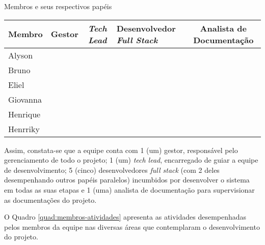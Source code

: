 \begin{quadro}[ht]
	\setlength{\tabcolsep}{3pt}
	\begin{center}
		\caption{\label{frame:distribuicao-papeis}Membros e seus respectivos papéis}
		\begin{tabular}{|l|c|c|m{3cm}|c|}
			\hline
			\textbf{Membro} & \textbf{Gestor} & \textbf{\textit{Tech Lead}} & \centering\textbf{Desenvolvedor \textit{Full Stack}} & \textbf{Analista de Documentação} \\
			\hline
			Alyson & \checkmark &  & \centering\checkmark &  \\
			\hline
			Bruno &  &  & \centering\checkmark &  \\
			\hline
			Eliel &  &  & \centering\checkmark &  \\
			\hline
			Giovanna &  &  &  & \checkmark \\
			\hline
			Henrique &  &  & \centering\checkmark &  \\
			\hline
			Henrriky &  & \checkmark & \centering\checkmark &  \\
			\hline
		\end{tabular}
	\end{center}
\end{quadro}

\indent Assim, constata-se que a equipe conta com 1 (um) gestor, responsável pelo gerenciamento de todo o projeto; 1 (um) \textit{tech lead}, encarregado de guiar a equipe de desenvolvimento; 5 (cinco) desenvolvedores \textit{full stack} (com 2 deles desempenhando outros papéis paralelos) incumbidos por desenvolver o sistema em todas as suas etapas e 1 (uma) analista de documentação para supervisionar as documentações do projeto. 

O Quadro \ref{quad:membros-atividades} apresenta as atividades desempenhadas pelos membros da equipe nas diversas áreas que contemplaram o desenvolvimento do projeto.

